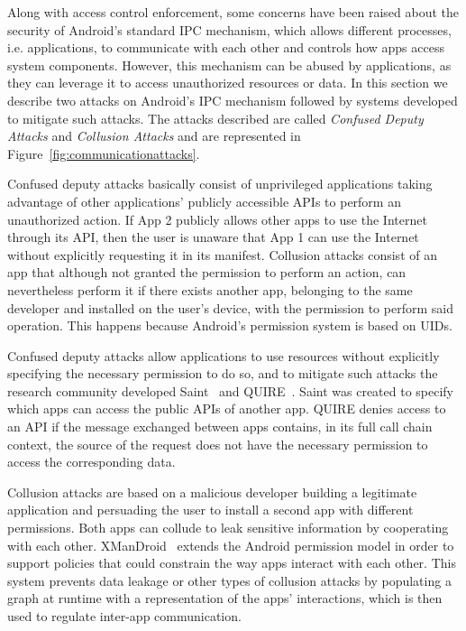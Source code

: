 Along with access control enforcement, some concerns have been raised about the security of Android's standard \ac{IPC} mechanism, which allows different processes, i.e. applications, to communicate with each other and controls how apps access system components. However, this mechanism can be abused by applications, as they can leverage it to access unauthorized resources or data. In this section we describe two attacks on Android's IPC mechanism followed by systems developed to mitigate such attacks. The attacks described are called \emph{Confused Deputy Attacks} and \emph{Collusion Attacks} and are represented in Figure~\ref{fig:communicationattacks}.

Confused deputy attacks basically consist of unprivileged applications taking advantage of other applications’ publicly accessible APIs to perform an unauthorized action. If App 2 publicly allows other apps to use the Internet through its API, then the user is unaware that App 1 can use the Internet without explicitly requesting it in its manifest. Collusion attacks consist of an app that although not granted the permission to perform an action, can nevertheless perform it if there exists another app, belonging to the same developer and installed on the user’s device, with the permission to perform said operation. This happens because Android’s permission system is based on UIDs.

Confused deputy attacks allow applications to use resources without explicitly specifying the necessary permission to do so, and to mitigate such attacks the research community developed Saint~\cite{ongtang2012semantically} and QUIRE~\cite{dietz2011quire}. Saint was created to specify which apps can access the public APIs of another app. QUIRE denies access to an API if the message exchanged between apps contains, in its full call chain context, the source of the request does not have the necessary permission to access the corresponding data.

Collusion attacks are based on a malicious developer building a legitimate application and persuading the user to install a second app with different permissions. Both apps can collude to leak sensitive information by cooperating with each other. XManDroid~\cite{bugiel2011xmandroid} extends the Android permission model in order to support policies that could constrain the way apps interact with each other. This system prevents data leakage or other types of collusion attacks by populating a graph at runtime with a representation of the apps’ interactions, which is then used to regulate inter-app communication.

